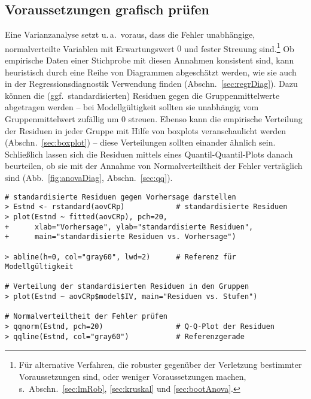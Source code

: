 \subsection{Voraussetzungen grafisch prüfen}

Eine Varianzanalyse setzt u.\,a.\ voraus, dass die Fehler unabhängige, normalverteilte Variablen mit Erwartungswert $0$ und fester Streuung sind.\footnote{Für alternative Verfahren, die robuster gegenüber der Verletzung bestimmter Voraussetzungen sind, oder weniger Voraussetzungen machen, s.\ Abschn.\ \ref{sec:lmRob}, \ref{sec:kruskal} und \ref{sec:bootAnova}.} Ob empirische Daten einer Stichprobe mit diesen Annahmen konsistent sind, kann heuristisch durch eine Reihe von Diagrammen abgeschätzt werden, wie sie auch in der Regressionsdiagnostik Verwendung finden (Abschn.\ \ref{sec:regrDiag}). Dazu können die (ggf.\ standardisierten) Residuen gegen die Gruppenmittelwerte abgetragen werden -- bei Modellgültigkeit sollten sie unabhängig vom Gruppenmittelwert zufällig um $0$ streuen. Ebenso kann die empirische Verteilung der Residuen in jeder Gruppe mit Hilfe von boxplots veranschaulicht werden (Abschn.\ \ref{sec:boxplot}) -- diese Verteilungen sollten einander ähnlich sein. Schließlich lassen sich die Residuen mittels eines Quantil-Quantil-Plots danach beurteilen, ob sie mit der Annahme von Normalverteiltheit der Fehler verträglich sind (Abb.\ \ref{fig:anovaDiag}, Abschn.\ \ref{sec:qq}).
\begin{lstlisting}
# standardisierte Residuen gegen Vorhersage darstellen
> Estnd <- rstandard(aovCRp)            # standardisierte Residuen
> plot(Estnd ~ fitted(aovCRp), pch=20,
+      xlab="Vorhersage", ylab="standardisierte Residuen",
+      main="standardisierte Residuen vs. Vorhersage")

> abline(h=0, col="gray60", lwd=2)      # Referenz für Modellgültigkeit

# Verteilung der standardisierten Residuen in den Gruppen
> plot(Estnd ~ aovCRp$model$IV, main="Residuen vs. Stufen")

# Normalverteiltheit der Fehler prüfen
> qqnorm(Estnd, pch=20)                 # Q-Q-Plot der Residuen
> qqline(Estnd, col="gray60")           # Referenzgerade
\end{lstlisting}

